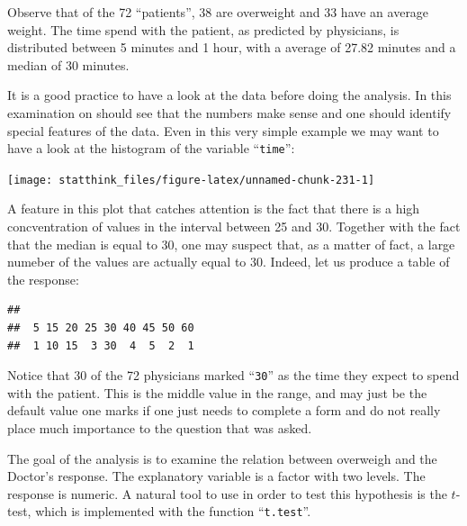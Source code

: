 \documentclass[]{krantz}
\makeatletter
\newenvironment{Shaded}{\begin{snugshade}}{\end{snugshade}}
\newcommand{\KeywordTok}[1]{\textcolor[rgb]{0.13,0.29,0.53}{\textbf{#1}}}
\newcommand{\OperatorTok}[1]{\textcolor[rgb]{0.81,0.36,0.00}{\textbf{#1}}}
\newcommand{\NormalTok}[1]{#1}
\newenvironment{kframe}{%
\medskip{}
\setlength{\fboxsep}{.8em}
 \def\at@end@of@kframe{}%
 \ifinner\ifhmode%
  \def\at@end@of@kframe{\end{minipage}}%
  \begin{minipage}{\columnwidth}%
 \fi\fi%
 \def\FrameCommand##1{\hskip\@totalleftmargin \hskip-\fboxsep
 \colorbox{shadecolor}{##1}\hskip-\fboxsep
     \hskip-\linewidth \hskip-\@totalleftmargin \hskip\columnwidth}%
 \MakeFramed {\advance\hsize-\width
   \@totalleftmargin\z@ \linewidth\hsize
   \@setminipage}}%
 {\par\unskip\endMakeFramed%
 \at@end@of@kframe}
\renewenvironment{Shaded}{\begin{kframe}}{\end{kframe}}
\theoremstyle{definition}
\theoremstyle{definition}
\theoremstyle{definition}
\theoremstyle{remark}
\makeatother
\begin{document}
Observe that of the 72 ``patients'', 38 are overweight and 33 have an
average weight. The time spend with the patient, as predicted by
physicians, is distributed between 5 minutes and 1 hour, with a average
of 27.82 minutes and a median of 30 minutes.

It is a good practice to have a look at the data before doing the
analysis. In this examination on should see that the numbers make sense
and one should identify special features of the data. Even in this very
simple example we may want to have a look at the histogram of the
variable ``\texttt{time}'':

\begin{Shaded}
\end{Shaded}

\begin{center}\texttt{[image: statthink\_files/figure-latex/unnamed-chunk-231-1]} \end{center}

A feature in this plot that catches attention is the fact that there is
a high concventration of values in the interval between 25 and 30.
Together with the fact that the median is equal to 30, one may suspect
that, as a matter of fact, a large numeber of the values are actually
equal to 30. Indeed, let us produce a table of the response:

\begin{Shaded}
\end{Shaded}

\begin{verbatim}
## 
##  5 15 20 25 30 40 45 50 60 
##  1 10 15  3 30  4  5  2  1
\end{verbatim}

Notice that 30 of the 72 physicians marked ``\texttt{30}'' as the time
they expect to spend with the patient. This is the middle value in the
range, and may just be the default value one marks if one just needs to
complete a form and do not really place much importance to the question
that was asked.

The goal of the analysis is to examine the relation between overweigh
and the Doctor's response. The explanatory variable is a factor with two
levels. The response is numeric. A natural tool to use in order to test
this hypothesis is the \(t\)-test, which is implemented with the
function ``\texttt{t.test}''.
\end{document}
